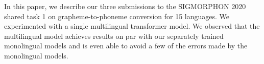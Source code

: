 In this paper, we describe our three submissions to the SIGMORPHON 2020 shared task 1 on grapheme-to-phoneme conversion for 15 languages. We experimented with a single multilingual transformer model. We observed that the multilingual model achieves results on par with our separately trained monolingual models and is even able to avoid a few of the errors made by the monolingual models.
